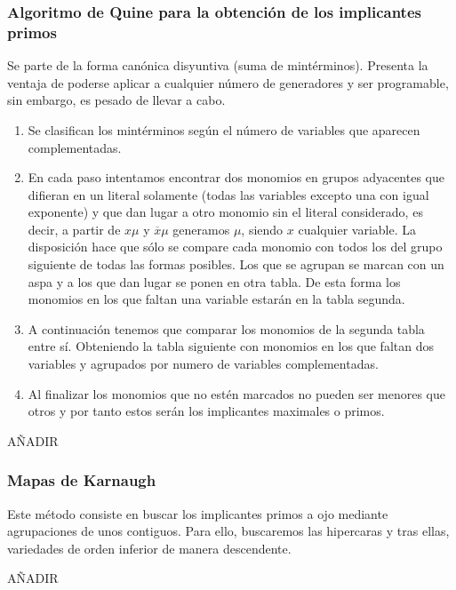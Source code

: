 \subsubsection{Algoritmo de Quine para la obtención de los implicantes primos}
Se parte de la forma canónica disyuntiva (suma de mintérminos). Presenta la ventaja de poderse aplicar a cualquier número de generadores y ser programable, sin embargo, es pesado de llevar a cabo.
\begin{enumerate}
    \item Se clasifican los mintérminos según el número de variables que aparecen complementadas.
    \item En cada paso intentamos encontrar dos monomios en grupos adyacentes que difieran en un literal solamente
          (todas las variables excepto una con igual exponente) y que dan lugar a otro monomio sin el literal considerado,
          es decir, a partir de $x\mu$ y $\overline{x}\mu$ generamos $\mu$, siendo $x$ cualquier variable. La disposición hace que sólo se compare
          cada monomio con todos los del grupo siguiente de todas las formas posibles. Los que se agrupan se marcan
          con un aspa y a los que dan lugar se ponen en otra tabla. De esta forma los monomios en los que faltan una
          variable estarán en la tabla segunda.
    \item A continuación tenemos que comparar los monomios de la segunda tabla entre sí. Obteniendo la tabla siguiente con monomios en los que faltan dos variables y agrupados por numero de variables complementadas.
    \item Al finalizar los monomios que no estén marcados no pueden ser menores que otros y por tanto estos serán los implicantes maximales o primos.
\end{enumerate}

\begin{ejemplo}
    AÑADIR
\end{ejemplo}

\subsubsection{Mapas de Karnaugh}
Este método consiste en buscar los implicantes primos a ojo mediante agrupaciones de unos contiguos. Para ello, buscaremos las hipercaras y tras ellas, variedades de orden inferior de manera descendente.
\begin{ejemplo}
    AÑADIR
\end{ejemplo}


